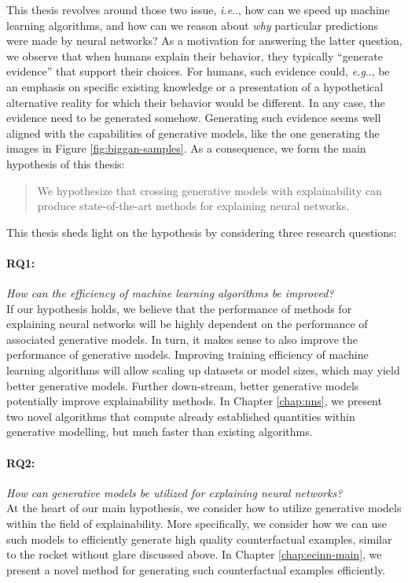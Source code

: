 \documentclass[11pt,a4paper,twoside,openright,final]{memoir}
\makeatletter
\DeclareRobustCommand\onedot{\futurelet\@let@token\@onedot}
\def\@onedot{\ifx\@let@token.\else.\null\fi\xspace}
\def\eg{\emph{e.g}\onedot} \def\Eg{\emph{E.g}\onedot}
\def\ie{\emph{i.e}\onedot} \def\Ie{\emph{I.e}\onedot}
\makeatother
\begin{document}
This thesis revolves around those two issue, \ie, how can we speed up machine learning algorithms, and how can we reason about \emph{why} particular predictions were made by neural networks? 
As a motivation for answering the latter question, we observe that when humans explain their behavior, they typically ``generate evidence'' that support their choices.
For humans, such evidence could, \eg, be an emphasis on specific existing knowledge or a presentation of a hypothetical alternative reality for which their behavior would be different.
In any case, the evidence need to be generated somehow.
Generating such evidence seems well aligned with the capabilities of generative models, like the one generating the images in Figure \ref{fig:biggan-samples}. 
As a consequence, we form the main hypothesis of this thesis:
%
\begin{quote}
    We hypothesize that crossing generative models with explainability can produce state-of-the-art methods for explaining neural networks. 
\end{quote}
%
This thesis sheds light on the hypothesis by considering three research questions:
\paragraph{RQ1:} \emph{How can the efficiency of machine learning algorithms be improved?}\\
If our hypothesis holds, we believe that the performance of methods for explaining neural networks will be highly dependent on the performance of associated generative models. 
In turn, it makes sense to also improve the performance of generative models.
Improving training efficiency of machine learning algorithms will allow scaling up datasets or model sizes, which may yield better generative models. 
Further down-stream, better generative models potentially improve explainability methods.
%
In Chapter \ref{chap:nns}, we present two novel algorithms that compute already established quantities within generative modelling, but much faster than existing algorithms.  

\paragraph{RQ2:} \emph{How can generative models be utilized for explaining neural networks?}\\
At the heart of our main hypothesis, we consider how to utilize generative models within the field of explainability.
More specifically, we consider how we can use such models to efficiently generate high quality counterfactual examples, similar to the rocket without glare discussed above.
In Chapter \ref{chap:ecinn-main}, we present a novel method for generating such counterfactual examples efficiently.
\end{document}
